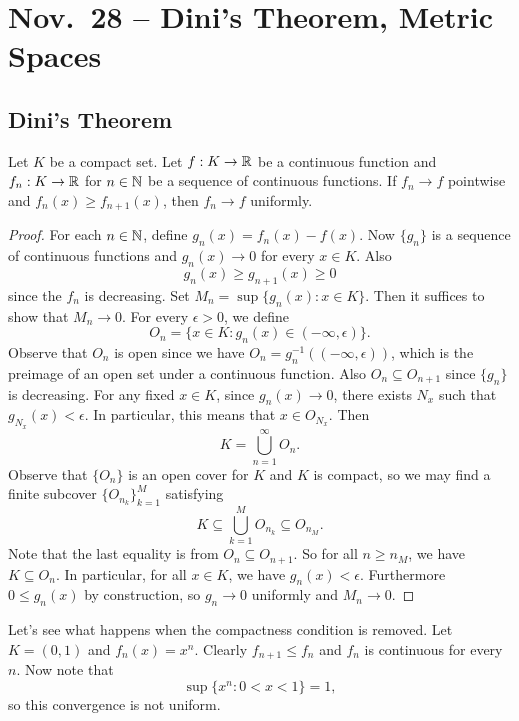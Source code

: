 \chapter{Nov.~28 -- Dini's Theorem, Metric Spaces}

\section{Dini's Theorem}

\begin{theorem}
  Let $K$ be a compact set. Let $f : K \to \mathbb{R}$
  be a continuous function and $f_{n} : K \to \mathbb{R}$ for
  $n \in \mathbb{N}$
  be a sequence of continuous functions. If $f_n \to f$
  pointwise and $f_n(x) \ge f_{n + 1}(x)$, then $f_n \to f$
  uniformly.
\end{theorem}

\begin{proof}
  For each $n \in \mathbb{N}$, define $g_n(x) = f_n(x) - f(x)$. Now
  $\{g_n\}$ is a sequence of continuous functions and
  $g_n(x) \to 0$ for every $x \in K$. Also
  \[g_n(x) \ge g_{n + 1}(x) \ge 0\]
  since the $f_n$ is decreasing.
  Set $M_n = \sup \{g_n(x) : x \in K\}$. Then it suffices to
  show that $M_n \to 0$. For every $\epsilon > 0$, we define
  \[
    O_n = \{x \in K : g_n(x) \in (-\infty, \epsilon)\}.
  \]
  Observe that $O_n$ is open since we have
  $O_n = g_n^{-1}((-\infty, \epsilon))$, which is the
  preimage of an open set under a continuous function.
  Also $O_n \subseteq O_{n + 1}$ since $\{g_n\}$ is
  decreasing.
  For any fixed $x \in K$, since $g_n(x) \to 0$, there
  exists $N_x$ such that $g_{N_x}(x) < \epsilon$. In
  particular, this means that $x \in O_{N_x}$. Then
  \[
    K = \bigcup_{n = 1}^\infty O_n.
  \]
  Observe that $\{O_n\}$ is an open cover for $K$ and $K$
  is compact, so
  we may find a finite subcover
  $\{O_{n_k}\}_{k = 1}^M$ satisfying
  \[
    K \subseteq \bigcup_{k = 1}^M O_{n_k} \subseteq O_{n_M}.
  \]
  Note that the last equality is from
  $O_n \subseteq O_{n + 1}$. So for all $n \ge n_M$,
  we have $K \subseteq O_n$. In particular, for all
  $x \in K$, we have $g_n(x) < \epsilon$. Furthermore
  $0 \le g_n(x)$ by construction, so $g_n \to 0$
  uniformly and $M_n \to 0$.
\end{proof}

\begin{example}
  Let's see what happens when the compactness condition
  is removed. Let $K = (0, 1)$ and $f_n(x) = x^n$.
  Clearly $f_{n + 1} \le f_n$ and $f_n$ is continuous
  for every $n$. Now note that
  \[\sup\{x^n : 0 < x < 1\} = 1,\]
  so this convergence is not uniform.
\end{example}

